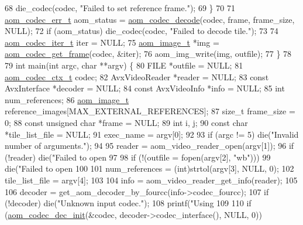 \begin{DoxyCodeInclude}
{68     die\_codec(codec, \textcolor{stringliteral}{"Failed to set reference frame."});
69   \}
70 
71   \hyperlink{group__codec_gaaae61e0f8663e6137f1e228757248e7c}{aom\_codec\_err\_t} aom\_status = \hyperlink{group__decoder_gab03fdb999d1f83a5896869a3ba5f68f7}{aom\_codec\_decode}(codec, frame, frame\_size, 
      NULL);
72   \textcolor{keywordflow}{if} (aom\_status) die\_codec(codec, \textcolor{stringliteral}{"Failed to decode tile."});
73 
74   \hyperlink{group__codec_gadf9e173c9e02788a9999399edab20a02}{aom\_codec\_iter\_t} iter = NULL;
75   \hyperlink{structaom__image}{aom\_image\_t} *img = \hyperlink{group__decoder_ga780aad27a2728abefab725faa3bc4f79}{aom\_codec\_get\_frame}(codec, &iter);
76   aom\_img\_write(img, outfile);
77 \}
78 
79 \textcolor{keywordtype}{int} main(\textcolor{keywordtype}{int} argc, \textcolor{keywordtype}{char} **argv) \{
80   FILE *outfile = NULL;
81   \hyperlink{structaom__codec__ctx}{aom\_codec\_ctx\_t} codec;
82   AvxVideoReader *reader = NULL;
83   \textcolor{keyword}{const} AvxInterface *decoder = NULL;
84   \textcolor{keyword}{const} AvxVideoInfo *info = NULL;
85   \textcolor{keywordtype}{int} num\_references;
86   \hyperlink{structaom__image}{aom\_image\_t} reference\_images[MAX\_EXTERNAL\_REFERENCES];
87   \textcolor{keywordtype}{size\_t} frame\_size = 0;
88   \textcolor{keyword}{const} \textcolor{keywordtype}{unsigned} \textcolor{keywordtype}{char} *frame = NULL;
89   \textcolor{keywordtype}{int} i, j;
90   \textcolor{keyword}{const} \textcolor{keywordtype}{char} *tile\_list\_file = NULL;
91   exec\_name = argv[0];
92 
93   \textcolor{keywordflow}{if} (argc != 5) die(\textcolor{stringliteral}{"Invalid number of arguments."});
94 
95   reader = aom\_video\_reader\_open(argv[1]);
96   \textcolor{keywordflow}{if} (!reader) die(\textcolor{stringliteral}{"Failed to open %
97 
98   \textcolor{keywordflow}{if} (!(outfile = fopen(argv[2], \textcolor{stringliteral}{"wb"})))
99     die(\textcolor{stringliteral}{"Failed to open %
100 
101   num\_references = (int)strtol(argv[3], NULL, 0);
102   tile\_list\_file = argv[4];
103 
104   info = aom\_video\_reader\_get\_info(reader);
105 
106   decoder = get\_aom\_decoder\_by\_fourcc(info->codec\_fourcc);
107   \textcolor{keywordflow}{if} (!decoder) die(\textcolor{stringliteral}{"Unknown input codec."});
108   printf(\textcolor{stringliteral}{"Using %
109 
110   \textcolor{keywordflow}{if} (\hyperlink{group__decoder_gafdbfca65b19ab1f6d72b32cd01753b9b}{aom\_codec\_dec\_init}(&codec, decoder->codec\_interface(), NULL, 0))
}}}}
\end{DoxyCodeInclude}
